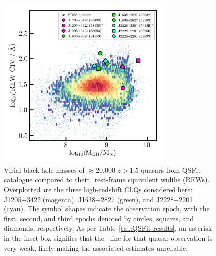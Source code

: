 \documentclass[fleqn,usenatbib]{mnras}
\begin{document}
\begin{figure}
  \centering
  \includegraphics[width=8.5cm, trim=0.2cm 0.2cm 0.0cm 0.2cm, clip]
  {figures/CIV_CLQs_MBHvsREW_20200710.png}
   \vspace{-12pt}
   \caption[]{
     Virial black hole masses of 
     $\approx$20,000 $z>1.5$ quasars from QSFit catalogue
     \citep{Calderone2017} compared to their \civ\ rest-frame equivalent
     widths (REWs).  Overplotted are the three high-redshift CLQs
     considered here: J1205+3422 (magenta), J1638+2827 (green), and
     J2228+2201 (cyan).  The symbol shapes indicate the observation epoch,
     with the first, second, and third epochs denoted by circles, squares,
     and diamonds, respectively. As per Table~\ref{tab:QSFit-results}, an
     asterisk in the inset box signifies that the \civ\ line for that
     quasar observation is very weak, likely making the associated
     estimates unreliable.}
   \label{fig:CIV_MBHvsREW}
\end{figure}
\end{document}
